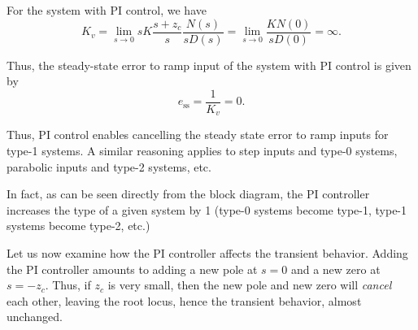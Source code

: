 \documentclass[a4paper,11pt]{report}
\theoremstyle{definition}
\newcommand{\sse}{\mathrm{ss}}
\begin{document}
For the system with PI control, we have
\[
K_v = \lim_{s\to 0} sK\frac{s+z_c}{s}\frac{N(s)}{sD(s)} = \lim_{s\to 0}
\frac{KN(0)}{sD(0)} = \infty.
\]

Thus, the steady-state error to ramp input of the system with PI
control is given by
\[
e_\sse = \frac{1}{K_v} = 0.
\]

Thus, PI control enables cancelling the steady state error to ramp
inputs for type-1 systems. A similar reasoning applies to step inputs
and type-0 systems, parabolic inputs and type-2 systems, etc.

In fact, as can be seen directly from the block diagram, the PI
controller increases the type of a given system by 1 (type-0 systems
become type-1, type-1 systems become type-2, etc.)

Let us now examine how the PI controller affects the transient
behavior. Adding the PI controller amounts to adding a new pole at
$s=0$ and a new zero at $s=-z_c$. Thus, if $z_c$ is very small, then
the new pole and new zero will \emph{cancel} each other, leaving the
root locus, hence the transient behavior, almost unchanged.
\end{document}
